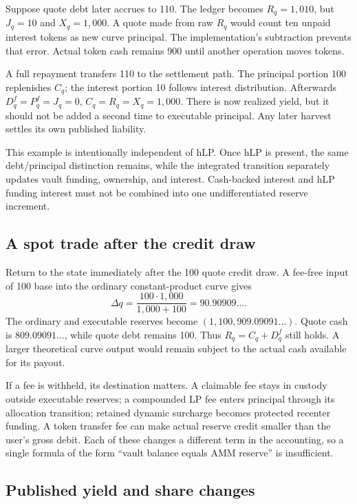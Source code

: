 Suppose quote debt later accrues to 110. The ledger becomes $R_q=1{,}010$, but $J_q=10$ and $X_q=1{,}000$. A quote made from raw $R_q$ would count ten unpaid interest tokens as new curve principal. The implementation's subtraction prevents that error. Actual token cash remains 900 until another operation moves tokens.

A full repayment transfers 110 to the settlement path. The principal portion 100 replenishes $C_q$; the interest portion 10 follows interest distribution. Afterwards $D_q^f=P_q^f=J_q=0$, $C_q=R_q=X_q=1{,}000$. There is now realized yield, but it should not be added a second time to executable principal. Any later harvest settles its own published liability.

This example is intentionally independent of hLP. Once hLP is present, the same debt/principal distinction remains, while the integrated transition separately updates vault funding, ownership, and interest. Cash-backed interest and hLP funding interest must not be combined into one undifferentiated reserve increment.

\subsection{A spot trade after the credit draw}

Return to the state immediately after the 100 quote credit draw. A fee-free input of 100 base into the ordinary constant-product curve gives
\[
\Delta q=\frac{100\cdot1{,}000}{1{,}000+100}=90.90909\ldots.
\]
The ordinary and executable reserves become $(1{,}100,909.09091\ldots)$. Quote cash is $809.09091\ldots$, while quote debt remains 100. Thus $R_q=C_q+D_q^f$ still holds. A larger theoretical curve output would remain subject to the actual cash available for its payout.

If a fee is withheld, its destination matters. A claimable fee stays in custody outside executable reserves; a compounded LP fee enters principal through its allocation transition; retained dynamic surcharge becomes protected recenter funding. A token transfer fee can make actual reserve credit smaller than the user's gross debit. Each of these changes a different term in the accounting, so a single formula of the form ``vault balance equals AMM reserve'' is insufficient.

\subsection{Published yield and share changes}

